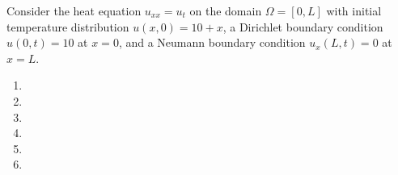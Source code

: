 Consider the heat equation $u_{xx} = u_t$ on the domain $\Omega = [0, L]$ with initial temperature distribution 
$u(x, 0) = 10 + x$, a Dirichlet boundary condition $u(0, t) = 10$ at $x = 0$, and a Neumann boundary condition 
$u_x(L, t) = 0$ at $x = L$.

\begin{enumerate}
  \item 
  \pagebreak
  \item 
  \pagebreak
  \item 
  \pagebreak
  \item 
  \pagebreak
  \item 
  \pagebreak
  \item 
\end{enumerate} 